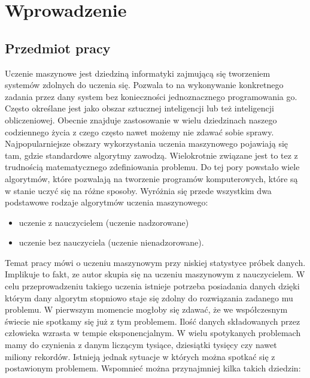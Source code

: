 \section{Wprowadzenie}\label{intro}
\subsection{Przedmiot pracy}\label{matter}
Uczenie maszynowe jest dziedziną informatyki zajmującą się tworzeniem systemów zdolnych do uczenia się. Pozwala to na wykonywanie konkretnego zadania przez dany system bez konieczności jednoznacznego programowania go. 
Często określane jest jako obszar sztucznej inteligencji lub też inteligencji obliczeniowej\cite{stefanowski}. Obecnie znajduje zastosowanie w wielu dziedzinach naszego codziennego życia z czego często nawet możemy nie zdawać sobie sprawy.
Najpopularniejsze obszary wykorzystania uczenia maszynowego pojawiają się tam, gdzie standardowe algorytmy zawodzą. Wielokrotnie związane jest to tez z trudnością matematycznego zdefiniowania problemu. 
 Do tej pory powstało wiele algorytmów, które pozwalają na tworzenie programów komputerowych, które są w stanie uczyć się na różne sposoby. Wyróżnia się przede wszystkim dwa podstawowe rodzaje algorytmów uczenia maszynowego:
\begin{itemize}
\item uczenie z nauczycielem (uczenie nadzorowane)
\item uczenie bez nauczyciela (uczenie nienadzorowane).
\end{itemize}
Temat pracy mówi o uczeniu maszynowym przy niskiej statystyce próbek danych. Implikuje to fakt, ze autor skupia się na uczeniu maszynowym z nauczycielem. W celu przeprowadzeniu takiego uczenia istnieje potrzeba posiadania danych dzięki którym dany algorytm stopniowo staje się zdolny do rozwiązania zadanego mu problemu.
 W pierwszym momencie mogłoby się zdawać, że we współczesnym świecie nie spotkamy się już z tym problemem. Ilość danych składowanych przez człowieka wzrasta w tempie eksponencjalnym. W wielu spotykanych problemach mamy do czynienia z danym liczącym tysiące, dziesiątki tysięcy czy nawet miliony rekordów. Istnieją jednak sytuacje w których można spotkać się z postawionym problemem. Wspomnieć można przynajmniej kilka takich dziedzin:
